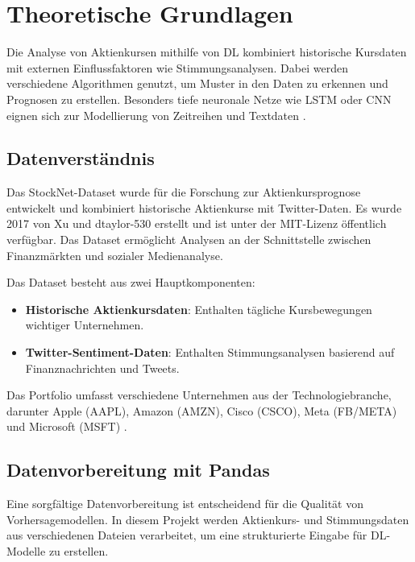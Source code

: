 
\newpage
\section{Theoretische Grundlagen}\label{sec:theorie}

Die Analyse von Aktienkursen mithilfe von \ac{DL} kombiniert historische Kursdaten mit externen Einflussfaktoren wie Stimmungsanalysen. Dabei werden verschiedene Algorithmen genutzt, um Muster in den Daten zu erkennen und Prognosen zu erstellen. Besonders tiefe neuronale Netze wie \ac{LSTM} oder \ac{CNN} eignen sich zur Modellierung von Zeitreihen und Textdaten \autocite{goodfellow2016deep}\autocite{hochreiter1997long}.

\subsection{Datenverständnis}\label{sec:theorie_data_understanding}

Das StockNet-Dataset wurde für die Forschung zur Aktienkursprognose entwickelt und kombiniert historische Aktienkurse mit Twitter-Daten. Es wurde 2017 von Xu und dtaylor-530 erstellt und ist unter der MIT-Lizenz öffentlich verfügbar. Das Dataset ermöglicht Analysen an der Schnittstelle zwischen Finanzmärkten und sozialer Medienanalyse.

Das Dataset besteht aus zwei Hauptkomponenten:
\begin{itemize}
	\item \textbf{Historische Aktienkursdaten}: Enthalten tägliche Kursbewegungen wichtiger Unternehmen.
	\item \textbf{Twitter-Sentiment-Daten}: Enthalten Stimmungsanalysen basierend auf Finanznachrichten und Tweets.
\end{itemize}

Das Portfolio umfasst verschiedene Unternehmen aus der Technologiebranche, darunter Apple (AAPL), Amazon (AMZN), Cisco (CSCO), Meta (FB/META) und Microsoft (MSFT) \autocite{xu2018StockMovement}\autocite{chen2018StockNet}.


\subsection{Datenvorbereitung mit Pandas}\label{sec:datenvorbereitung_pandas}

Eine sorgfältige Datenvorbereitung ist entscheidend für die Qualität von Vorhersagemodellen. In diesem Projekt werden Aktienkurs- und Stimmungsdaten aus verschiedenen Dateien verarbeitet, um eine strukturierte Eingabe für \ac{DL}-Modelle zu erstellen.

